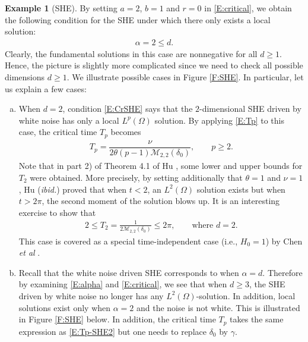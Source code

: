 \documentclass[12pt]{report}
\theoremstyle{plain}
\theoremstyle{definition}
\newtheorem{example}[theorem]{Example}
\numberwithin{equation}{section}
\begin{document}
\begin{example}[SHE] \label{Eg:CriSHE}
	By setting $a=2$, $b=1$ and $r=0$ in \eqref{E:critical}, we obtain the following condition for the
	SHE under which there only exists a local solution:
	\begin{align} \label{E:CrSHE}
	\alpha = 2 \le d .
	\end{align}
	Clearly, the fundamental solutions in this case are nonnegative for all $d\ge 1$.  Hence, the
	picture is slightly more complicated since we need to check all possible dimensions $d\ge 1$.  We
	illustrate possible cases in Figure \ref{F:SHE}. In particular, let us explain a few cases:
	\begin{enumerate}[(a)]
		\item When $d=2$, condition \eqref{E:CrSHE} says that the $2$-dimensional SHE driven by white
		noise has only a local $L^p(\Omega)$ solution. By applying \eqref{E:Tp} to this case, the
		critical time $T_p$ becomes
		\begin{align} \label{E:Tp-SHE2}
		T_p = \dfrac{\nu}{2\theta (p-1) \mathcal{M}_{2,2}(\delta_0)}, \qquad p\ge 2.
		\end{align}
		Note that in part 2) of Theorem 4.1 of Hu \cite{hu:02:chaos}, some lower and upper bounds for $
		T_2$ were obtained. More precisely, by setting additionally that $\theta=1$ and $\nu=1$, Hu
		({\it ibid.}) proved that when $t<2$, an $L^2(\Omega)$ solution exists but when $t>2\pi$, the
		second moment of the solution blows up. It is an interesting exercise to show that
		\begin{align*}
		2\le T_2 = \frac{1}{2 \mathcal{M}_{2,2}(\delta_0)} \le 2\pi, \qquad \text{where $d=2$.}
		\end{align*}
		This case is covered as a special time-independent case (i.e., $H_0=1$) by Chen {\it et al} \cite[Theorem 3.4 and Remark 3.13]{chen.deya.ea:21:moment}.
		\item Recall that the white noise driven SHE corresponds to when $\alpha=d$. Therefore by
		examining \eqref{E:alpha} and \eqref{E:critical}, we see that when $d\ge 3$, the SHE driven by
		white noise no longer has any $L^2(\Omega)$-solution. In addition, local solutions exist only
		when $\alpha=2$ and the noise is not white. This is illustrated in Figure \ref{F:SHE} below.
		In addition, the critical time $T_p$ takes the same expression as \eqref{E:Tp-SHE2} but one
		needs to replace $\delta_0$ by $\gamma$.
	\end{enumerate}
\end{example}
\end{document}
